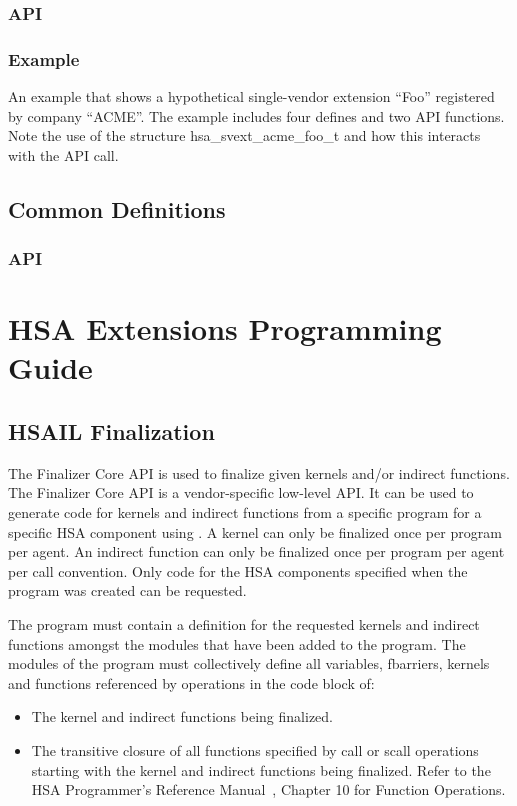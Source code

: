 \documentclass[final]{book}
\newcommand{\reftyp}[1]{#1}
\begin{document}
\subsection{API}


\subsection{Example}
An example that shows a hypothetical single-vendor extension ``Foo'' registered
by company ``ACME''. The example includes four defines and two API functions.
Note the use of the structure \reftyp{hsa_svext_acme_foo_t} and how this
interacts with the  API call.



\section{Common Definitions}\label{sec:other}
\subsection{API}

%


\chapter{HSA Extensions Programming Guide}

\section{HSAIL Finalization}\label{sec:finalizer}

The Finalizer Core API is used to finalize given kernels and/or indirect
functions.  The Finalizer Core API is a vendor-specific low-level API. It can be
used to generate code for kernels and indirect functions from a specific program
for a specific HSA component using . A kernel can only
be finalized once per program per agent. An indirect function can only be
finalized once per program per agent per call convention. Only code for the HSA
components specified when the program was created can be requested.

The program must contain a definition for the requested kernels and indirect
functions amongst the modules that have been added to the program. The modules
of the program must collectively define all variables, fbarriers, kernels and
functions referenced by operations in the code block of:
\begin{itemize}
\item{The kernel and indirect functions being finalized.}
\item{The transitive closure of all functions specified by call or scall
operations starting with the kernel and indirect functions being finalized.
Refer to the HSA Programmer's Reference Manual~\cite{prm}, Chapter 10 for
Function Operations.}
\end{itemize}
\end{document}

